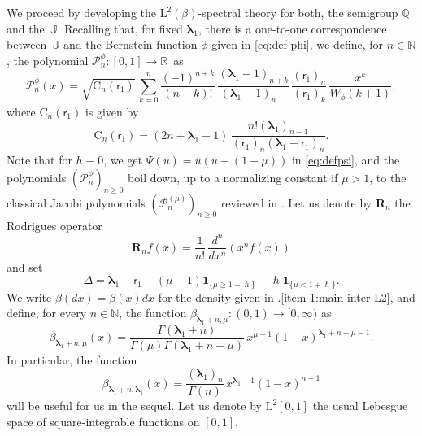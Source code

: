 \documentclass[10pt]{amsart}
\theoremstyle{plain}
\theoremstyle{definition}
\newcommand{\N}{\mathbb{N}}
\newcommand{\R}{\mathbb{R}}
\renewcommand{\P}{\mathcal{P}}
\newcommand{\Rc}{\mathbf{R}}
\newcommand{\C}{{\mathrm{C}}}
\newcommand{\J}{\mathds{Q}}
\newcommand{\calJ}{\mathds{J}}
\newcommand{\Leb}{\mathrm{L}}
\newcommand{\lam}{{\bm{\lambda}_1}}
\newcommand{\vat}{{\mathsf{r}_1}}
\newcommand{\gab}[1][\lam,\mo]{{\beta_{#1}}}
\let\h\hslash
\let\mo\mu
\let\bpsi\beta
\begin{document}
We proceed by developing the $\Leb^2(\bpsi)$-spectral theory for both, the semigroup $\J$ and the~$\calJ$. Recalling that, for fixed $\lam$, there is a one-to-one correspondence between~$\calJ$ and the Bernstein function $\phi$ given in \eqref{eq:def-phi}, we define, for $n \in \N$, the polynomial \hbox{$\P_n^\phi \colon [0,1] \to \R$}~as
\begin{equation}
\label{eq:Jpolpsi}
\P_n^\phi (x)= \sqrt{\C_n(\vat)}\, \sum_{k=0}^n \frac{(-1)^{n+k}}{(n-k)!}\, \frac{(\lam-1)_{n+k}}{(\lam-1)_{n\phantom{+k}}}\, \frac{(\vat)_n}{(\vat)_k}\, \frac{x^k}{W_\phi(k+1)},
\end{equation}
where $\C_n(\vat)$ is given by\vspace*{-3pt}
\begin{equation*}
\C_n(\vat)=(2n+\lam-1)\,\frac{n!(\lam)_{n-1}}{(\vat)_n(\lam-\vat)_n}.
\end{equation*}
Note that for $h \equiv 0$, we get $\Psi(u) = u(u-(1-\mo))$ in \eqref{eq:defpsi}, and the polynomials $(\P_n^\phi)_{n \geq 0}$ boil down, up to a normalizing constant if $\mu>1$, to the classical Jacobi polynomials $(\P_n^{(\mo)})_{n \geq 0}$ reviewed in . Let us denote by $\Rc_n$ the Rodrigues operator\vspace*{-3pt}
\begin{equation}
\label{eq:def-Rodrigues}
\Rc_n f(x) = \frac{1}{n!}\, \frac{d^n}{dx^n}(x^n f(x))
\end{equation}
and set\vspace*{-3pt}
\begin{equation} \label{Delta}
\Delta = \lam-\vat - (\mo-1)\bm{1}_{\{\mo \geq 1+\h\}} - \h\bm{1}_{\{\mo < 1+\h\}}.
\end{equation}
We write $\bpsi(dx) = \bpsi(x)dx$ for the density given in .\eqref{item-1:main-inter-L2}, and define,
for every $n \in \N$, the function $\gab[\lam+n,\mu] \colon (0,1) \to [0,\infty)$ as
\begin{equation*}
\gab[\lam+n,\mu](x) = \frac{\Gamma(\lam+n)}{\Gamma(\mu)\Gamma(\lam+n-\mu)}\, x^{\mu-1}(1-x)^{\lam+n-\mu-1}.
\end{equation*}
In particular, the function\vspace*{-3pt}
\begin{equation*}
\gab[\lam+n,\lam](x) = \frac{(\lam)_n}{\Gamma(n)}\, x^{\lam-1}(1-x)^{n-1}
\end{equation*}
will be useful for us in the sequel. Let us denote by
$\Leb^2[0,1]$ the usual Lebesgue space of square-integrable functions on $[0,1]$.
\end{document}
